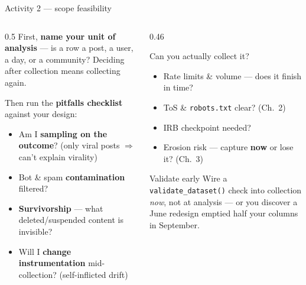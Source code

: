 \documentclass[9pt,aspectratio=169]{beamer}
\begin{document}
\begin{frame}{Activity 2 --- scope feasibility}
    \begin{columns}[T]
        \begin{column}{0.5\textwidth}
            First, \textbf{name your unit of analysis} --- is a row a post, a user, a day, or a community? Deciding after collection means collecting again.

            \vspace{0.6em}

            Then run the \textbf{pitfalls checklist} against your design:
            \begin{itemize}\small
                \item Am I \textbf{sampling on the outcome}? (only viral posts $\Rightarrow$ can't explain virality)
                \item Bot \& spam \textbf{contamination} filtered?
                \item \textbf{Survivorship} --- what deleted/suspended content is invisible?
                \item Will I \textbf{change instrumentation} mid-collection? (self-inflicted drift)
            \end{itemize}
        \end{column}
        \begin{column}{0.46\textwidth}
            \begin{block}{Can you actually collect it?}
                \footnotesize
                \begin{itemize}\footnotesize
                    \item Rate limits \& volume --- does it finish in time?
                    \item ToS \& \texttt{robots.txt} clear? (Ch.~2)
                    \item IRB checkpoint needed?
                    \item Erosion risk --- capture \textbf{now} or lose it? (Ch.~3)
                \end{itemize}
            \end{block}
            \begin{alertblock}{Validate early}
                \footnotesize Wire a \texttt{validate\_dataset()} check into collection \textit{now}, not at analysis --- or you discover a June redesign emptied half your columns in September.
            \end{alertblock}
        \end{column}
    \end{columns}
\end{frame}
\end{document}
